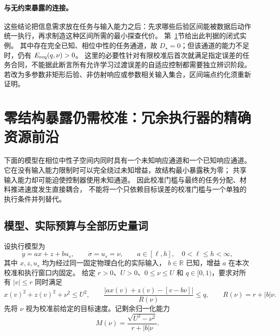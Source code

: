 \documentclass[11pt,a4paper]{article}
\numberwithin{equation}{section}
\theoremstyle{definition}
\begin{document}
\paragraph{与无约束暴露的连接。}
这些结论把信息需求放在任务与输入能力之后：先求哪些后验区间能被数据后动作统一执行，再求制造这种区间所需的最小探查代价。
第~\ref{v44r:sec:redundant}节给出此判据的闭式实例。
其中存在完全已知、相位中性的任务通道，故 $D_\star=0$；但该通道的能力不足时，仍有 $E_{\rm req}(q,\nu)>0$。
这里的必要性针对有限校准后首次就满足指定误差的任务合同，不能据此断言所有允许学习过渡误差的自适应控制都需要独立辨识阶段。
若改为多参数非矩形后验、非仿射响应或参数相关输入集合，区间端点约化须重新证明。




\section{零结构暴露仍需校准：冗余执行器的精确资源前沿}
\label{v44r:sec:redundant}

下面的模型在相位中性子空间内同时具有一个未知响应通道和一个已知响应通道。
它在没有输入能力限制时可以完全绕过未知增益，故结构最小暴露秩为零；
共享输入能力却可能迫使控制器使用未知通道。
因此校准门槛与最终的任务分配、材料推进速度发生直接耦合，
不能将一个只依赖目标误差的校准门槛与一个单独的执行条件并列替代。

\subsection{模型、实际预算与全部历史量词}

设执行模型为
\begin{equation}
 \dot y=ax+z+bu_s,\qquad \dot\sigma=u_s=\nu,
 \qquad a\in[\ell,h],\quad 0<\ell\le h<\infty,
 \label{v44r:eq:plant}
\end{equation}
其中 $x,z,u_s$ 均为经过同一固定物理白化的实际输入，
$b\in\mathbb R$ 已知，增益 $a$ 在本次校准和执行窗口内固定。
给定 $r>0$、$U>0$、$0\le\nu\le U$ 和 $q\in[0,1)$，要求对所有
$|v|\le r$ 同时满足
\begin{equation}
 x(v)^2+z(v)^2+\nu^2\le U^2,
 \qquad
 \frac{|ax(v)+z(v)-[v-b\nu]|}{R(\nu)}\le q,
 \qquad R(\nu)=r+|b|\nu.
 \label{v44r:eq:execution-contract}
\end{equation}
先将 $\nu$ 视为校准前给定的目标速度。记剩余归一化能力
\begin{equation}
 M(\nu)=\frac{\sqrt{U^2-\nu^2}}{r+|b|\nu}.
 \label{v44r:eq:normalized-capacity}
\end{equation}
\end{document}
